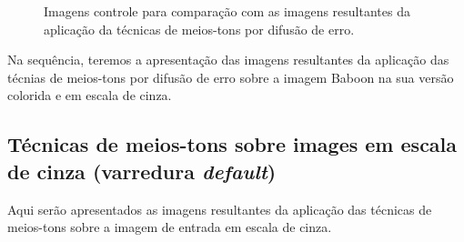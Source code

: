 \documentclass{article}
\begin{document}
\begin{figure}[!htp]%
	\centering
	
	\qquad
	
	\caption{Imagens controle para comparação com as imagens resultantes da aplicação da técnicas de meios-tons por difusão de erro.}%
	
	\label{fig:imagem:controle}%
\end{figure}

Na sequência, teremos a apresentação das imagens resultantes da aplicação das técnias de meios-tons por difusão de erro sobre a imagem Baboon na sua versão colorida e em escala de cinza.

%
\subsection{Técnicas de meios-tons sobre images em escala de cinza (varredura \textit{default})}
Aqui serão apresentados as imagens resultantes da aplicação das técnicas de meios-tons sobre a imagem de entrada em escala de cinza.
\end{document}

